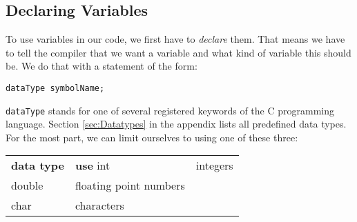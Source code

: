 \subsection{Declaring Variables} \label{sec:DeclareVars}
To use variables in our code, we first have to \emph{declare} them. That means we have to tell the compiler that we want a variable and what kind of variable this should be. We do that with a statement of the form:
\begin{codebox}
\texttt{dataType symbolName;}
\end{codebox}

\texttt{dataType} stands for one of several registered keywords of the C programming language. Section \ref{sec:Datatypes} in the appendix lists all predefined data types. For the most part, we can limit ourselves to using one of these three:
\newpage
\begin{center}

\begin{tabularx}
	{.5505\linewidth}
	{TU}
\toprule[1.5pt]
	\textbf{\textrm{data type}} & \textbf{use} \tabcrlf
	int                         & integers \\
	double                      & floating point numbers \\
	char                        & characters \\
\bottomrule[1.5pt]
\end{tabularx}
\end{center}

